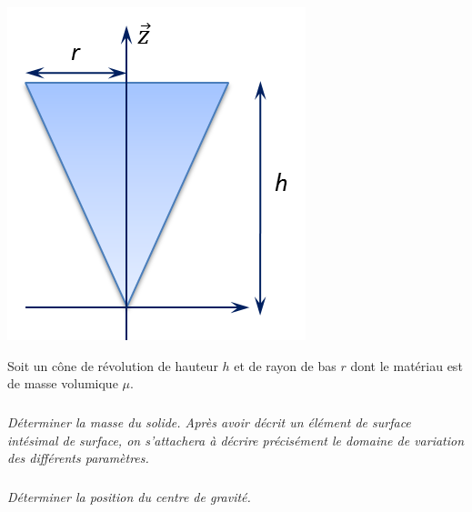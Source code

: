 \documentclass[10pt]{article}
\begin{document}
\begin{minipage}[c]{.3\linewidth}
\begin{center}
\includegraphics[width=.95\textwidth]{images/cone}
\end{center}
\end{minipage}\hfill
\begin{minipage}[c]{.65\linewidth}
Soit un cône de révolution de hauteur $h$ et de rayon de bas $r$ dont le matériau est de masse volumique $\mu$.

\subparagraph{}
\textit{Déterminer la masse du solide. Après avoir décrit un élément de surface intésimal de surface, on s'attachera à décrire précisément le domaine de variation des différents paramètres.}

\subparagraph{}
\textit{Déterminer la position du centre de gravité.}
\end{minipage}
\end{document}
